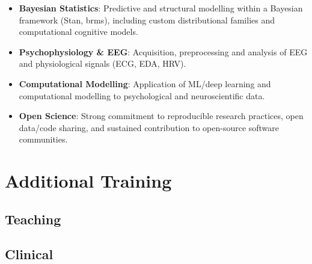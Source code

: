 \documentclass[11pt,a4paper,]{awesome-cv}
\providecommand{\tightlist}{%
	\setlength{\itemsep}{0pt}\setlength{\parskip}{0pt}}
\begin{document}
\small

\begin{itemize}
\tightlist
\item
  \textbf{Bayesian Statistics}: Predictive and structural modelling
  within a Bayesian framework (Stan, brms), including custom
  distributional families and computational cognitive models.
\item
  \textbf{Psychophysiology \& EEG}: Acquisition, preprocessing and
  analysis of EEG and physiological signals (ECG, EDA, HRV).
\item
  \textbf{Computational Modelling}: Application of ML/deep learning and
  computational modelling to psychological and neuroscientific data.
\item
  \textbf{Open Science}: Strong commitment to reproducible research
  practices, open data/code sharing, and sustained contribution to
  open-source software communities.
\end{itemize}

\normalsize

\section{Additional Training}\label{additional-training}

\subsection{Teaching}\label{teaching-1}

\begin{cventries}
    \vspace{-4.0mm}
    \vspace{-4.0mm}
\end{cventries}

\subsection{Clinical}\label{clinical-1}

\begin{cventries}
    \vspace{-4.0mm}
    \vspace{-4.0mm}
    \vspace{-4.0mm}
\end{cventries}
\end{document}
